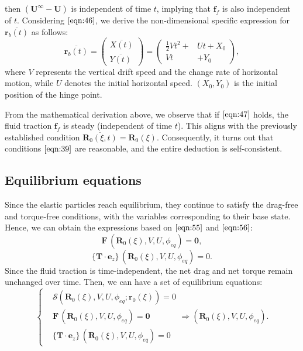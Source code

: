 \documentclass[a4paper,12pt]{report}
\begin{document}
then $(\textbf{U}^{\infty}-\textbf{U})$ is independent of time $t$, implying that $\textbf{f}_{f}$ is also independent of $t$.
Considering $\eqref{eqn:46}$, we derive the non-dimensional specific expression for $\overline{\textbf{r}_b(t)}$ as follows:
\begin{equation}
	\label{eqn:47}
	\overline{\textbf{r}_b(t)}=\left(\begin{aligned}
		\overline{X(t)}\\
		\overline{Y(t)}
	\end{aligned}\right)=\left(\begin{aligned}
		\frac{1}{2}V t^2+&Ut+X_0\\
		Vt&+Y_0
	\end{aligned}\right),
\end{equation}
where $V$ represents the vertical drift speed and the change rate  of horizontal motion, while $U$ denotes the initial horizontal speed. $(X_0, Y_0)$ is the initial position of the hinge point.

 From the mathematical derivation above, we observe that if $\eqref{eqn:47}$ holds, the fluid traction $\textbf{f}_{f}$ is steady (independent of time $t$). This aligns with the previously established condition $\overline{\textbf{R}_0(\xi,t)}=\textbf{R}_0(\xi)$. Consequently, it turns out that conditions $\eqref{eqn:39}$ are reasonable, and the entire deduction is self-consistent.

\subsection{Equilibrium equations}
Since the elastic particles reach equilibrium, they continue to satisfy the drag-free and torque-free conditions, with the variables corresponding to their base state. Hence, we can obtain the expressions based on $\eqref{eqn:55}$ and $\eqref{eqn:56}$:
\begin{equation}
	\label{eqn:120}
	\textbf{F}\,(\textbf{R}_0(\xi), V, U, \phi_{eq})=\textbf{0},
\end{equation}
\begin{equation}
	\label{eqn:121}
	\{\mathbf{T}\cdot\textbf{e}_z\}\,(\textbf{R}_0(\xi), V, U, \phi_{eq})=0.
\end{equation}
Since the fluid traction is time-independent, the net drag and net torque remain unchanged over time. Then, we can have a set of equilibrium equations:
\begin{equation}
	\label{eqn:122}
	\left\{\begin{aligned}
		&\bm{\mathcal{S}}\left(\textbf{R}_0(\xi), V, U,\phi_{eq};\textbf{r}_0(\xi)\right)=0\\
		&\textbf{F}\,(\textbf{R}_0(\xi), V, U, \phi_{eq})=\textbf{0}\\
		&\{\mathbf{T}\cdot\textbf{e}_z\}\,(\textbf{R}_0(\xi), V, U, \phi_{eq})=0
	\end{aligned}\right.\Longrightarrow \left(\textbf{R}_0(\xi), V, U, \phi_{eq}\right).
\end{equation}
\end{document}
